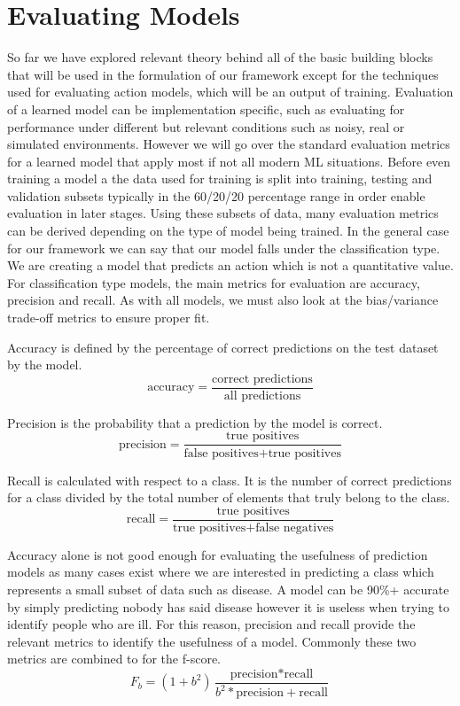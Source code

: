 \section{Evaluating Models}
So far we have explored relevant theory behind all of the basic building blocks that will be used in the formulation of our framework except for the techniques used for evaluating action models, which will be an output of training. Evaluation of a learned model can be implementation specific, such as evaluating for performance under different but relevant conditions such as noisy, real or simulated environments. However we will go over the standard evaluation metrics for a learned model that apply most if not all modern ML situations. Before even training a model a the data used for training is split into training, testing and validation subsets typically in the 60/20/20 percentage range in order enable evaluation in later stages. Using these subsets of data, many evaluation metrics can be derived depending on the type of model being trained. In the general case for our framework we can say that our model falls under the classification type. We are creating a model that predicts an action which is not a quantitative value. For classification type models, the main metrics for evaluation are accuracy, precision and recall. As with all models, we must also look at the bias/variance trade-off metrics to ensure proper fit.

Accuracy is defined by the percentage of correct predictions on the test dataset by the model. \[ \text{accuracy} = \frac{\text{correct predictions}}{\text{all predictions}}\]

Precision is the probability that a prediction by the model is correct.
\[ \text{precision} = \frac{\text{true positives}}{\text{false positives}+\text{true positives}}\]

Recall is calculated with respect to a class. It is the number of correct predictions for a class divided by the total number of elements that truly belong to the class.
\[ \text{recall} = \frac{\text{true positives}}{\text{true positives}+\text{false negatives}}\]

Accuracy alone is not good enough for evaluating the usefulness of prediction models as many cases exist where we are interested in predicting a class which represents a small subset of data such as disease. A model can be 90\%+ accurate by simply predicting nobody has said disease however it is useless when trying to identify people who are ill. For this reason, precision and recall provide the relevant metrics to identify the usefulness of a model. Commonly these two metrics are combined to for the f-score.
\[F_{b}=(1+b^2)\frac{\text{precision}*\text{recall}}{b^2*\text{precision}+\text{recall}}\]


